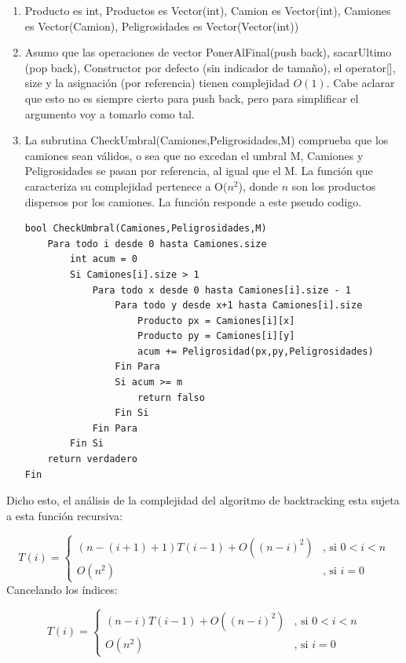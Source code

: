 \documentclass[10pt,a4paper]{article}
\begin{document}
\begin{enumerate}

\item Producto es int, Productos es Vector(int), Camion es Vector(int), Camiones es Vector(Camion), Peligrosidades es Vector(Vector(int))
\item Asumo que las operaciones de vector PonerAlFinal(push back), sacarUltimo (pop back), Constructor por defecto (sin indicador de tamaño), el operator[], size y la asignación (por referencia) tienen complejidad $O(1)$. Cabe aclarar que esto no es siempre cierto para push back, pero para simplificar el argumento voy a tomarlo como tal.
\item La subrutina CheckUmbral(Camiones,Peligrosidades,M) comprueba que los camiones sean válidos, o sea que no excedan el umbral M, Camiones y Peligrosidades se pasan por referencia, al igual que el M. La función que caracteriza su complejidad pertenece a O($n^2$), donde $n$ son los productos dispersos por los camiones. La función responde a este pseudo codigo.
\bigskip
\begin{lstlisting}
bool CheckUmbral(Camiones,Peligrosidades,M)
	Para todo i desde 0 hasta Camiones.size
		int acum = 0
		Si Camiones[i].size > 1
			Para todo x desde 0 hasta Camiones[i].size - 1
				Para todo y desde x+1 hasta Camiones[i].size
					Producto px = Camiones[i][x]
					Producto py = Camiones[i][y]
					acum += Peligrosidad(px,py,Peligrosidades)
				Fin Para
				Si acum >= m
					return falso
				Fin Si
			Fin Para
		Fin Si
	return verdadero
Fin
\end{lstlisting}

\end{enumerate}

Dicho esto, el análisis de la complejidad del algoritmo de backtracking esta sujeta a esta función recursiva:

\[ T(i) = \left\{ \begin{array}{ll}
         (n-(i+1)+1)T(i-1) + O((n-i)^2) & \mbox{, si $0 < i < n$}\\
         O(n^2) & \mbox{, si $i = 0$}\end{array} \right. \]
Cancelando los índices:

\[ T(i) = \left\{ \begin{array}{ll}
         (n-i)T(i-1) + O((n-i)^2) & \mbox{, si $0 < i < n$}\\
         O(n^2) & \mbox{, si $i = 0$}\end{array} \right. \]       
\end{document}
